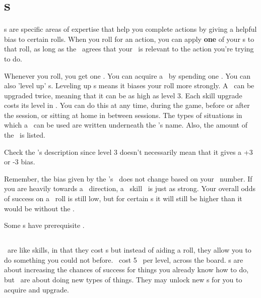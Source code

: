 
\section{\skillC s}

\par
\skillC s are specific areas of expertise that help you complete actions by giving a helpful bias to certain rolls. When you roll for an action, you can apply \textbf{one} of your \skill s to that roll, as long as the \gm\, agrees that your \skill\, is relevant to the action you're trying to do.

\par
Whenever you roll, you get one \xp . You can acquire a \skill\, by spending one \xp . You can also 'level up' \skill s. Leveling up \skill s means it biases your roll more strongly. A \skill\, can be upgraded twice, meaning that it can be as high as level 3. Each skill upgrade costs its level in \xp . You can do this at any time, during the game, before or after the session, or sitting at home in between sessions. The types of situations in which a \skill\, can be used are written underneath the \skill 's name. Also, the amount of the \modifier\, is listed.

\par
Check the \skill 's description since level 3 doesn't necessarily mean that it gives a +3 or -3 bias.

\par
Remember, the bias given by the \skill 's \modifier\, does not change based on your \both\, number. If you are heavily towards a \feelings\, direction, a \lasers\, skill \modifier\, is just as strong. Your overall odds of success on a \lasers\, roll is still low, but for certain \skill s it will still be higher than it would be without the \skill .

\par
Some \skill s have prerequisite \abilityP .

\subsection{\abilityPC}
\abilityPC\, are like skills, in that they cost \xp s but instead of aiding a roll, they allow you to do something you could not before. \abilityPC\, cost 5 \xp\, per level, across the board. \skillC s are about increasing the chances of success for things you already know how to do, but \abilityP\, are about doing new types of things. They may unlock new \skill s for you to acquire and upgrade.